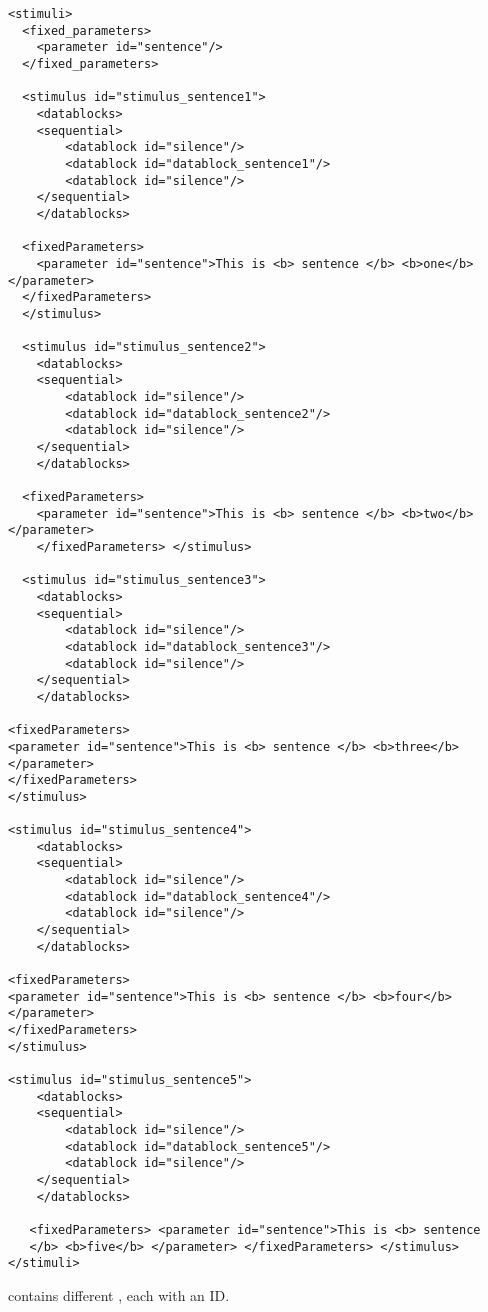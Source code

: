 \begin{lstlisting}
<stimuli>
  <fixed_parameters>
    <parameter id="sentence"/>
  </fixed_parameters>

  <stimulus id="stimulus_sentence1">
    <datablocks>
    <sequential>
        <datablock id="silence"/>
        <datablock id="datablock_sentence1"/>
        <datablock id="silence"/>
    </sequential>
    </datablocks>

  <fixedParameters>
    <parameter id="sentence">This is <b> sentence </b> <b>one</b></parameter>
  </fixedParameters>
  </stimulus>

  <stimulus id="stimulus_sentence2">
    <datablocks>
    <sequential>
        <datablock id="silence"/>
        <datablock id="datablock_sentence2"/>
        <datablock id="silence"/>
    </sequential>
    </datablocks>

  <fixedParameters>
    <parameter id="sentence">This is <b> sentence </b> <b>two</b></parameter>
    </fixedParameters> </stimulus>

  <stimulus id="stimulus_sentence3">
    <datablocks>
    <sequential>
        <datablock id="silence"/>
        <datablock id="datablock_sentence3"/>
        <datablock id="silence"/>
    </sequential>
    </datablocks>

<fixedParameters>
<parameter id="sentence">This is <b> sentence </b> <b>three</b></parameter>
</fixedParameters>
</stimulus>

<stimulus id="stimulus_sentence4">
    <datablocks>
    <sequential>
        <datablock id="silence"/>
        <datablock id="datablock_sentence4"/>
        <datablock id="silence"/>
    </sequential>
    </datablocks>

<fixedParameters>
<parameter id="sentence">This is <b> sentence </b> <b>four</b></parameter>
</fixedParameters>
</stimulus>

<stimulus id="stimulus_sentence5">
    <datablocks>
    <sequential>
        <datablock id="silence"/>
        <datablock id="datablock_sentence5"/>
        <datablock id="silence"/>
    </sequential>
    </datablocks>

   <fixedParameters> <parameter id="sentence">This is <b> sentence
   </b> <b>five</b> </parameter> </fixedParameters> </stimulus>
</stimuli>
\end{lstlisting}

 contains different , each with
an ID.

